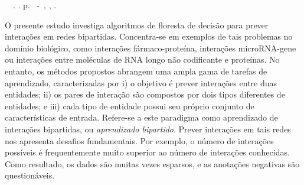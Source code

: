 \setlength{\absparsep}{18pt} %
\begin{resumo}
	\begin{flushleft} 
			\setlength{\absparsep}{0pt} %
			\SingleSpacing 
			\imprimirautorabr~~\textbf{\imprimirtituloresumo}.	\imprimirdata. \pageref{LastPage}p. 
			\imprimirtipotrabalho~-~\imprimirinstituicao, \imprimirlocal, \imprimirdata. 
 	\end{flushleft}
\OnehalfSpacing 				
	O presente estudo investiga algoritmos de floresta de decisão para prever interações em redes bipartidas.
	Concentra-se em exemplos de tais problemas no domínio biológico, como interações fármaco-proteína, interações microRNA-gene ou interações entre moléculas de RNA longo não codificante e proteínas.
	No entanto, os métodos propostos abrangem uma ampla gama de tarefas de aprendizado, caracterizadas por i) o objetivo é prever interações entre duas entidades; ii) os pares de interação são compostos por dois tipos diferentes de entidades; e iii) cada tipo de entidade possui seu próprio conjunto de características de entrada. 
	Refere-se a este paradigma como aprendizado de interações bipartidas, ou \emph{aprendizado bipartido}.
	Prever interações em tais redes nos apresenta desafios fundamentais. Por exemplo, o número de interações possíveis é frequentemente muito superior ao número de interações conhecidas. Como resultado, os dados são muitas vezes esparsos, e as anotações negativas são questionáveis.

\end{resumo}

